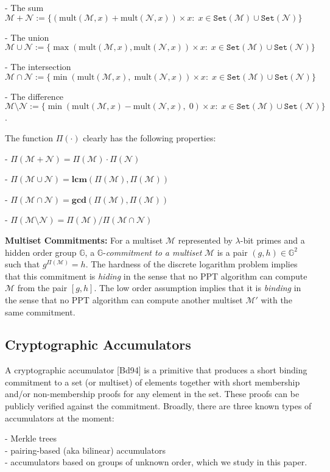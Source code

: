 \documentclass[11pt, lettersize, notitlepage, leqno, footskip=0.6cm]{article}
\newcommand{\ttt}{\texttt}
\newcommand{\bG}{\mathbb{G}}
\newcommand{\sett}{\ttt{Set}}
\newcommand{\mul}{\mr{mult}}
\newcommand{\mc}{\mathcal}
\newcommand{\mbf}{\mathbf}
\newcommand{\mr}{\mathrm}
\newcommand{\sm}{\setminus}
\newcommand{\lam}{\lambda}
\newcommand{\mcM}{\mc{M}}
\newcommand{\noin}{\noindent}
\newcommand{\LCM}{\mbf{lcm}}
\newcommand{\GCD}{\mbf{gcd}}
\numberwithin{equation}{section}
\begin{document}
\noin - The sum $\mc{M}+\mc{N} := \{(\mul(\mc{M},x)+\mul(\mc{N},x))\times x:\;x\in \sett(\mc{M})\cup\sett(\mc{N}) \}$

\noin - The union $\mc{M}\cup \mc{N} := \{\max(\mul(\mc{M},x),\mul(\mc{N},x))\times x:\;x\in \sett(\mc{M})\cup\sett(\mc{N})\}$

\noin - The intersection $\mc{M}\cap \mc{N} := \{\min(\mul(\mc{M},x),\;\mul(\mc{N},x))\times x:\;x\in \sett(\mc{M})\cup\sett(\mc{N})\}$

\noin - The difference $\mc{M}\sm \mc{N} := \{\min(\mul(\mc{M},x)-\mul(\mc{N},x),\; 0)\times x:\;x\in \sett(\mc{M})\cup\sett(\mc{N})\}$.\vspace{0.1cm}

\noin The function $\Pi(\cdot)$ clearly has the following properties:

\noin- $\Pi(\mc{M}+\mc{N})= \Pi(\mc{M})\cdot\Pi(\mc{N})$

\noin - $\Pi(\mc{M}\cup \mc{N}) = \LCM(\Pi(\mc{M}), \Pi(\mc{M}))$

\noin - $\Pi(\mc{M}\cap \mc{N}) = \GCD(\Pi(\mc{M}), \Pi(\mc{M}))$

\noin - $\Pi(\mc{M}\sm \mc{N}) = {\Pi(\mc{M})}/{\Pi(\mc{M}\cap \mc{N})}$\vspace{0.2cm}

\noin \textbf{Multiset Commitments:} For a multiset $\mc{M}$ represented by $\lam$-bit primes and a hidden order group $\bG$, a $\bG$-\textit{commitment to a multiset} $\mc{M}$ is a pair $(g, h)\in\bG^2$ such that $g^{\Pi(\mc{M})} = h$. The hardness of the discrete logarithm problem implies that this commitment is \textit{hiding} in the sense that no PPT algorithm can compute $\mcM$ from the pair $[g,h]$. The low order assumption implies that it is \textit{binding} in the sense that no PPT algorithm can compute another multiset $\mcM'$ with the same commitment.

\subsection{\fontsize{11}{11}\selectfont Cryptographic Accumulators }

A cryptographic accumulator [Bd94] is a primitive that produces a short binding commitment to a set (or multiset) of elements together with short membership and/or non-membership proofs for any element in the set. These proofs can be publicly verified against the commitment. Broadly, there are three known types of accumulators at the moment: 

\noin - Merkle trees\\
- pairing-based (aka bilinear) accumulators \\  
- accumulators based on groups of unknown order, which we study in this paper. 
\end{document}
